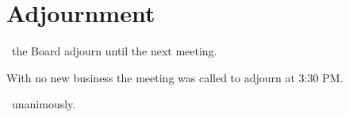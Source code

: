 \section*{Adjournment}

\begin{motion}
    \birt\ the Board adjourn until the next meeting.
    \movers{\nickta}{\benjamin}
    
    With no new business the meeting was called to adjourn at 3:30 PM.

    \carries\ unanimously. 
\end{motion}

